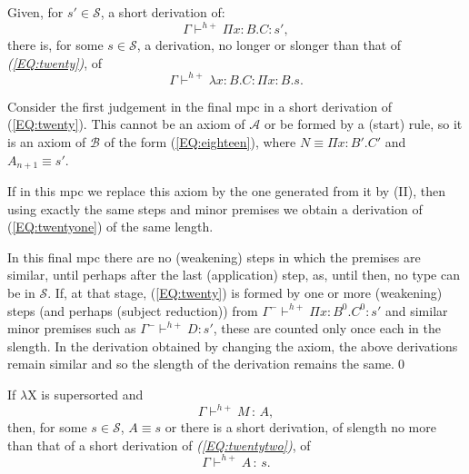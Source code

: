 \documentclass{LMCS}
\def\:{\mathbin{\,:\,}}
\begin{document}
\begin{lem}\label{L:twentytwo} Given, for $s'\in {\mathcal S}$, a
  short derivation of:
\begin{equation}\label{EQ:twenty}
 \Gamma\vdash^{h+}\Pi x{:}B.C:s',
\end{equation}
  there is, for some $s\in\mathcal S$, a derivation, no longer or
  slonger than that of \emph{(\ref{EQ:twenty})}, of
\begin{equation}\label{EQ:twentyone}
 \Gamma\vdash^{h+}\lambda x{:}B.C:\Pi x{:}B.s.
\end{equation}
\end{lem}

\proof Consider the first judgement in the final mpc in a short
  derivation of (\ref{EQ:twenty}). This cannot be an axiom of ${\mathcal
  A}$ or be formed by a (start) rule, so it is an axiom of ${\mathcal
  B}$ of the form (\ref{EQ:eighteen}), where $N\equiv\Pi x{:}B'.C'$
  and $A_{n+1}\equiv s'$.

  If in this mpc we replace this axiom by the one generated from it by
  (II), then using exactly the same steps and minor premises we obtain
  a derivation of (\ref{EQ:twentyone}) of the same length.

  In this final mpc there are no (weakening) steps in which the
  premises are similar, until perhaps after the last (application)
  step, as, until then, no type can be in ${\mathcal S}$. If, at that
  stage, (\ref{EQ:twenty}) is formed by one or more (weakening) steps
  (and perhaps (subject reduction)) from $\Gamma^-\vdash^{h+}\Pi
  x{:}B^0.C^0:s'$ and similar minor premises such as $\Gamma^-
 \vdash^{h+} D:s'$, these are counted only once each in the
  slength. In the derivation obtained by changing the axiom, the above
  derivations remain similar and so the slength of the derivation
  remains the same.\qed

\begin{lem}\label{L:twentythree}
  If $\lambda$X is supersorted and
\begin{equation}\label{EQ:twentytwo}
 \Gamma\vdash^{h+} M\:A,
\end{equation}
  then, for some $s\in\mathcal S$, $A\equiv s$ or there is a short
  derivation, of slength no more than that of a short derivation of
  \emph{(\ref{EQ:twentytwo})}, of
\begin{equation}\label{EQ:twentythree}
 \Gamma\vdash^{h+}A\:s.
\end{equation}
\end{lem}
\end{document}
